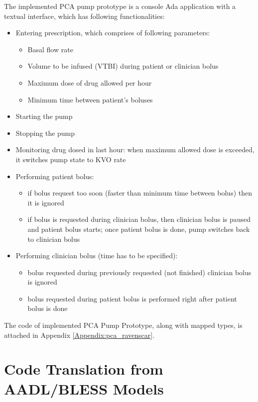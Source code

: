 The implemented PCA pump prototype is a console Ada application with a textual interface, which has following functionalities:
\begin{itemize} \itemsep0pt \parskip0pt 
	\item Entering prescription, which comprises of following parameters:
		\begin{itemize}
			\item Basal flow rate
			\item Volume to be infused (VTBI) during patient or clinician bolus
			\item Maximum dose of drug allowed per hour
			\item Minimum time between patient's boluses
		\end{itemize}
	\item Starting the pump
	\item Stopping the pump
	\item Monitoring drug dosed in last hour: when maximum allowed dose is exceeded, it switches pump state to KVO rate
	\item Performing patient bolus:
		\begin{itemize}
			\item if bolus request too soon (faster than minimum time between bolus) then it is ignored
			\item if bolus is requested during clinician bolus, then clinician bolus is paused and patient bolus starts; once patient bolus is done, pump switches back to clinician bolus
		\end{itemize}
	\item Performing clinician bolus (time has to be specified):
		\begin{itemize}
			\item bolus requested during previously requested (not finished) clinician bolus is ignored
			\item bolus requested during patient bolus is performed right after patient bolus is done
		\end{itemize}
\end{itemize}

The code of implemented PCA Pump Prototype, along with mapped types, is attached in Appendix \ref{Appendix:pca_ravenscar}.



\section{Code Translation from AADL/BLESS Models}
\label{pcapumpimpl:codegen}

